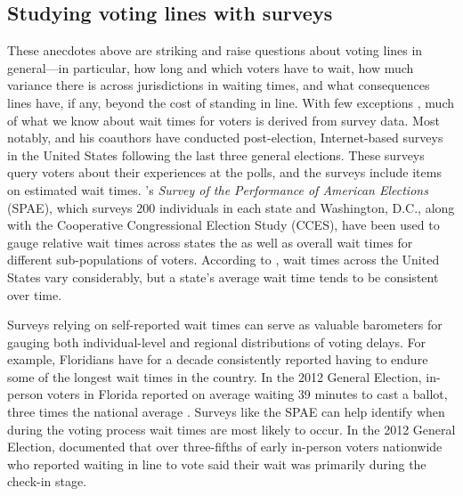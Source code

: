 \documentclass[12pt,titlepage]{article}
\begin{document}
\subsection*{Studying voting lines with surveys}

These anecdotes above are striking and raise questions about voting
lines in general---in particular, how long and which voters have to wait, how
much variance there is across jurisdictions in waiting times, and
what consequences lines have, if any, beyond the cost of standing in
line.  With few exceptions \citep[e.g.,][]{spencermarkovits:renege,
  herronsmith:hanoverstudy, pettigrew:longlinesminorityprecincts},
much of what we know about wait times for voters is derived from
survey data. Most notably, \citet{stewart:waitingtovote2012} and his
coauthors have conducted post-election, Internet-based surveys in the
United States following the last three general elections.  These
surveys query voters about their experiences at the polls, and the
surveys include items on estimated wait times.
\citeauthor{stewart:waitingtovote2012}'s \emph{Survey of the
  Performance of American Elections} (SPAE), which surveys 200
individuals in each state and Washington, D.C., along with the
Cooperative Congressional Election Study (CCES), have been used to
gauge relative wait times across states the as well as overall wait
times for different sub-populations of voters.  According to
\citeauthor{stewart:waitingtovote2012}, wait times across the United
States vary considerably, but a state's average wait time tends to be
consistent over time.

Surveys relying on self-reported wait times can serve as valuable
barometers for gauging both individual-level and regional
distributions of voting delays.  For example, Floridians have for a
decade consistently reported having to endure some of the longest wait
times in the country. In the 2012 General Election, in-person voters
in Florida reported on average waiting 39 minutes to cast a ballot,
three times the national average \citep{stewart:waitingtovote2012}.
Surveys like the SPAE can help identify when during the voting process
wait times are most likely to occur.  In the 2012 General Election,
\citeauthor{stewart:waitingtovote2012} documented that over
three-fifths of early in-person voters nationwide who reported waiting
in line to vote said their wait was primarily during the check-in
stage.
\end{document}
